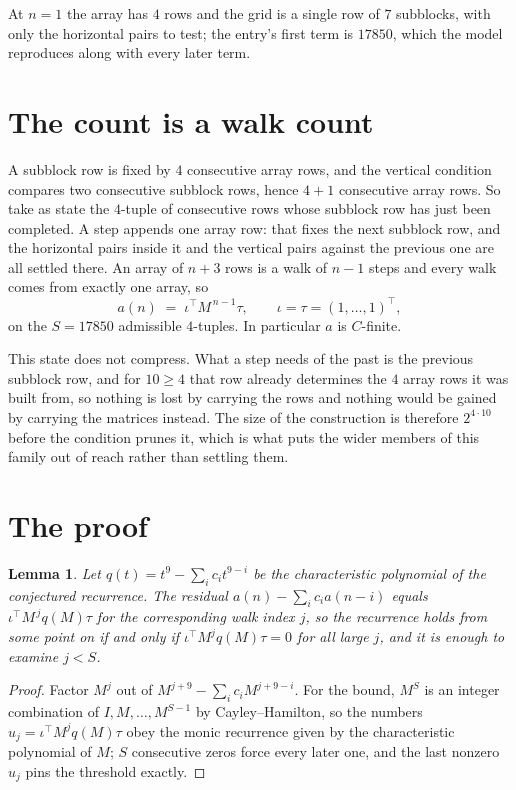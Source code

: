 \documentclass[11pt,a4paper]{article}
\theoremstyle{plain}
\newtheorem{lemma}[theorem]{Lemma}
\theoremstyle{definition}
\begin{document}
At $n=1$ the array has $4$ rows and the grid is a single row of $7$
subblocks, with only the horizontal pairs to test; the entry's first term is
$17850$, which the model reproduces along with every later term.

\section{The count is a walk count}

A subblock row is fixed by $4$ consecutive array rows, and the vertical condition compares
two consecutive subblock rows, hence $4+1$ consecutive array rows. So take as state the
$4$-tuple of consecutive rows whose subblock row has just been completed. A step appends one
array row: that fixes the next subblock row, and the horizontal pairs inside it and the
vertical pairs against the previous one are all settled there. An array of $n+3$ rows is
a walk of $n-1$ steps and every walk comes from exactly one array, so
\[
a(n)\;=\;\iota^{\!\top}M^{\,n-1}\tau,\qquad\iota=\tau=(1,\dots,1)^{\!\top},
\]
on the $S=17850$ admissible $4$-tuples. In particular $a$ is $C$-finite.

This state does not compress. What a step needs of the past is the previous subblock row, and
for $10\ge4$ that row already determines the $4$ array rows it was built from, so nothing
is lost by carrying the rows and nothing would be gained by carrying the matrices instead. The
size of the construction is therefore $2^{4\cdot10}$ before the condition prunes
it, which is what puts the wider members of this family out of reach rather than settling them.

\section{The proof}

\begin{lemma}\label{lem:crit}
Let $q(t)=t^{9}-\sum_i c_it^{9-i}$ be the characteristic polynomial of the
conjectured recurrence. The residual $a(n)-\sum_ic_ia(n-i)$ equals
$\iota^{\!\top}M^{\,j}q(M)\tau$ for the corresponding walk index $j$, so the recurrence
holds from some point on if and only if $\iota^{\!\top}M^{j}q(M)\tau=0$ for all large $j$,
and it is enough to examine $j<S$.
\end{lemma}

\begin{proof}
Factor $M^{j}$ out of $M^{j+9}-\sum_ic_iM^{j+9-i}$. For the bound, $M^{S}$
is an integer combination of $I,M,\dots,M^{S-1}$ by Cayley--Hamilton, so the numbers
$u_j=\iota^{\!\top}M^{j}q(M)\tau$ obey the monic recurrence given by the characteristic
polynomial of $M$; $S$ consecutive zeros force every later one, and the last nonzero $u_j$
pins the threshold exactly.
\end{proof}
\end{document}
